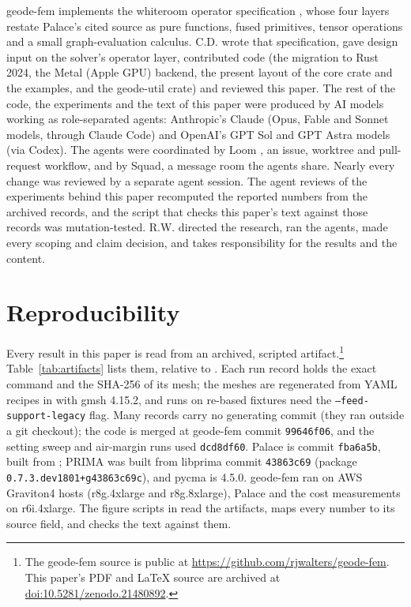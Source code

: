 \documentclass{anvil-paper}
\begin{document}
geode-fem implements the whiteroom operator specification
\citep{dunnavant2026whiteroom}, whose four layers restate Palace's cited
source as pure functions, fused primitives, tensor operations and a small
graph-evaluation calculus. C.D. wrote that specification, gave design input
on the solver's operator layer, contributed code (the migration to Rust
2024, the Metal (Apple GPU) backend, the present layout of the core crate
and the examples, and the geode-util crate) and reviewed this paper. The
rest of the code, the experiments and the text of this paper were produced
by AI models working as role-separated agents: Anthropic's Claude (Opus,
Fable and Sonnet models, through Claude Code) and OpenAI's GPT Sol and GPT
Astra models (via Codex). The agents were coordinated by Loom
\citep{loom}, an issue, worktree and pull-request workflow, and by Squad,
a message room the agents share. Nearly every change was reviewed by a
separate agent session. The agent reviews of the experiments behind this
paper recomputed the reported numbers from the archived records, and the
script that checks this paper's text against those records was
mutation-tested. R.W. directed the research, ran the agents, made every
scoping and claim decision, and takes responsibility for the results and
the content.

\section{Reproducibility}
\label{sec:repro}

Every result in this paper is read from an archived, scripted
artifact.\footnote{The geode-fem source is public at
\url{https://github.com/rjwalters/geode-fem}. This paper's PDF and \LaTeX{}
source are archived at
\href{https://doi.org/10.5281/zenodo.21480892}{doi:10.5281/zenodo.21480892}.}
Table~\ref{tab:artifacts} lists them, relative to
. Each run record holds the exact
command and the SHA-256 of its mesh; the meshes are regenerated from YAML
recipes in  with gmsh 4.15.2, and runs on re-based
fixtures need the \texttt{--feed-support-legacy} flag. Many records carry no
generating commit (they ran outside a git checkout); the code is merged at
geode-fem commit \texttt{99646f06}, and the setting sweep and air-margin
runs used \texttt{dcd8df60}. Palace is commit \texttt{fba6a5b}, built from
; PRIMA was built from libprima
commit \texttt{43863c69} (package \texttt{0.7.3.dev1801+g43863c69c}), and
pycma is 4.5.0. geode-fem ran on AWS Graviton4 hosts (r8g.4xlarge and
r8g.8xlarge), Palace and the cost measurements on r6i.4xlarge. The figure
scripts in  read the artifacts,  maps
every number to its source field, and  checks the
text against them.
\end{document}
